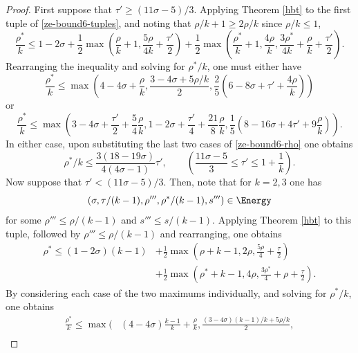 \begin{proof}
First suppose that $\tau' \ge (11\sigma - 5)/3$. Applying Theorem \ref{hbt} to the first tuple of \eqref{ze-bound6-tuples}, and noting that $\rho/k + 1 \ge 2\rho/k$ since $\rho/k \le 1$,
\[
\frac{\rho^*}{k} \le 1-2\sigma + \frac{1}{2}\max(\frac{\rho}{k}+1, \frac{5\rho}{4k} + \frac{\tau'}{2}) + \frac{1}{2}\max(\frac{\rho^*}{k}+1, \frac{4\rho}{k}, \frac{3\rho^*}{4k} +\frac{\rho}{k}+\frac{\tau'}{2}).
\]
Rearranging the inequality and solving for $\rho^*/k$, one must either have
\begin{equation}\label{ze-bound6-rhostar-bound-case01}
\frac{\rho^*}{k} \le \max(4 - 4\sigma + \frac{\rho}{k}, \frac{3 - 4\sigma + 5\rho/k}{2}, \frac{2}{5}(6 - 8\sigma + \tau' + \frac{4\rho}{k}))
\end{equation}
or
\begin{equation}\label{ze-bound6-rhostar-bound-case02}
\frac{\rho^*}{k} \le \max(3 - 4\sigma + \frac{\tau'}{2} + \frac{5}{4}\frac{\rho}{k}, 1 - 2\sigma + \frac{\tau'}{4} + \frac{21}{8}\frac{\rho}{k}, \frac{1}{5}(8 - 16\sigma + 4\tau' + 9\frac{\rho}{k})).
\end{equation}
In either case, upon substituting the last two cases of \eqref{ze-bound6-rho} one obtains
\begin{equation}\label{ze-bound6-rhostar-bound-case1}
\rho^*/k \le \frac{3(18-19\sigma)}{4(4\sigma-1)}\tau',\qquad (\frac{11\sigma - 5}{3} \le \tau'\le 1 + \frac{1}{k}).
\end{equation}
Now suppose that $\tau' < (11\sigma - 5)/3$. Then, note that for $k = 2, 3$ one has
\[
(\sigma, \tau/(k-1), \rho''', \rho^*/(k-1), s''') \in \Energy
\]
for some $\rho''' \le \rho /(k-1)$ and $s''' \le s/(k-1)$. Applying Theorem \ref{hbt} to this tuple, followed by $\rho''' \le \rho/(k - 1)$ and rearranging, one obtains
\begin{equation}\label{ze-bound6-rhostar-bound}
\begin{split}
\rho^* \le (1-2\sigma)(k - 1) &+ \frac{1}{2}\max(\rho+k - 1, 2\rho, \frac{5\rho}{4} + \frac{\tau}{2}) \\
&+ \frac{1}{2}\max(\rho^*+k - 1, 4\rho, \frac{3\rho^*}{4} + \rho+\frac{\tau}{2}).
\end{split}
\end{equation}
By considering each case of the two maximums individually, and solving for $\rho^*/k$, one obtains
\begin{equation}\label{ze-bound6-rhostar-bound3}
\begin{split}
\frac{\rho^*}{k} \le \max\bigg(&(4 - 4\sigma)\frac{k - 1}{k} + \frac{\rho}{k}, \frac{(3 - 4\sigma)(k - 1)/k + 5\rho/k}{2}, \\

\end{split}
\end{equation}
\end{proof}
